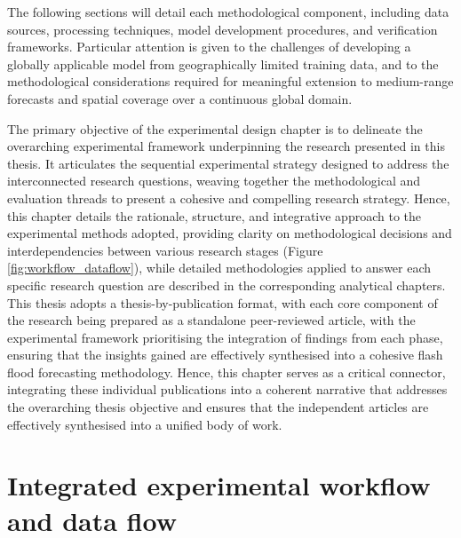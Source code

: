 The following sections will detail each methodological component, including data sources, processing techniques, model development procedures, and verification frameworks. Particular attention is given to the challenges of developing a globally applicable model from geographically limited training data, and to the methodological considerations required for meaningful extension to medium-range forecasts and spatial coverage over a continuous global domain.






The primary objective of the experimental design chapter is to delineate the overarching experimental framework underpinning the research presented in this thesis. It articulates the sequential experimental strategy designed to address the interconnected research questions, weaving together the methodological and evaluation threads to present a cohesive and compelling research strategy. Hence, this chapter details the rationale, structure, and integrative approach to the experimental methods adopted, providing clarity on methodological decisions and interdependencies between various research stages (Figure \ref{fig:workflow_dataflow}), while detailed methodologies applied to answer each specific research question are described in the corresponding analytical chapters. This thesis adopts a thesis-by-publication format, with each core component of the research being prepared as a standalone peer-reviewed article, with the experimental framework prioritising the integration of findings from each phase, ensuring that the insights gained are effectively synthesised into a cohesive flash flood forecasting methodology. Hence, this chapter serves as a critical connector, integrating these individual publications into a coherent narrative that addresses the overarching thesis objective and ensures that the independent articles are effectively synthesised into a unified body of work. 

\section{Integrated experimental workflow and data flow}

